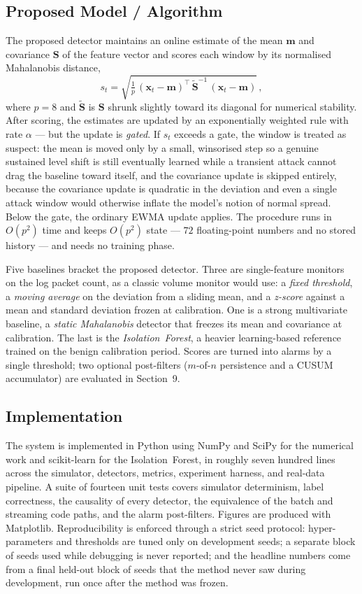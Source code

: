 \documentclass[11pt,a4paper]{article}
\begin{document}
\subsection{Proposed Model / Algorithm}
The proposed detector maintains an online estimate of the mean $\mathbf{m}$ and
covariance $\mathbf{S}$ of the feature vector and scores each window by its
normalised Mahalanobis distance,
\begin{equation}
  s_t = \sqrt{\tfrac{1}{p}\,(\mathbf{x}_t-\mathbf{m})^{\top}\,\tilde{\mathbf{S}}^{-1}\,(\mathbf{x}_t-\mathbf{m})}\,,
\end{equation}
where $p=8$ and $\tilde{\mathbf{S}}$ is $\mathbf{S}$ shrunk slightly toward its
diagonal for numerical stability. After scoring, the estimates are updated by an
exponentially weighted rule with rate $\alpha$ --- but the update is
\emph{gated}. If $s_t$ exceeds a gate, the window is treated as suspect: the mean
is moved only by a small, winsorised step so a genuine sustained level shift is
still eventually learned while a transient attack cannot drag the baseline toward
itself, and the covariance update is skipped entirely, because the covariance
update is quadratic in the deviation and even a single attack window would
otherwise inflate the model's notion of normal spread. Below the gate, the
ordinary EWMA update applies. The procedure runs in $O(p^2)$ time and keeps
$O(p^2)$ state --- $72$ floating-point numbers and no stored history --- and needs
no training phase.

Five baselines bracket the proposed detector. Three are single-feature monitors on
the log packet count, as a classic volume monitor would use: a \emph{fixed
threshold}, a \emph{moving average} on the deviation from a sliding mean, and a
\emph{z-score} against a mean and standard deviation frozen at calibration. One is
a strong multivariate baseline, a \emph{static Mahalanobis} detector that freezes
its mean and covariance at calibration. The last is the \emph{Isolation~Forest}, a
heavier learning-based reference trained on the benign calibration period. Scores
are turned into alarms by a single threshold; two optional post-filters ($m$-of-$n$
persistence and a CUSUM accumulator) are evaluated in Section~9.

\subsection{Implementation}
The system is implemented in Python using NumPy and SciPy for the numerical work
and scikit-learn for the Isolation~Forest, in roughly seven hundred lines across
the simulator, detectors, metrics, experiment harness, and real-data pipeline. A
suite of fourteen unit tests covers simulator determinism, label correctness, the
causality of every detector, the equivalence of the batch and streaming code
paths, and the alarm post-filters. Figures are produced with Matplotlib.
Reproducibility is enforced through a strict seed protocol: hyper-parameters and
thresholds are tuned only on development seeds; a separate block of seeds used
while debugging is never reported; and the headline numbers come from a final
held-out block of seeds that the method never saw during development, run once
after the method was frozen.
\end{document}
